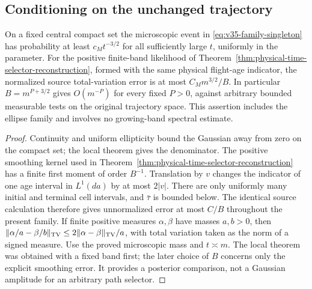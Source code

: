 \subsection{Conditioning on the unchanged trajectory}
\begin{corollary}
\label{cor:v35-family-posterior}
On a fixed central compact set the microscopic event in
\eqref{eq:v35-family-singleton} has probability at least $c_Mt^{-3/2}$
for all sufficiently large $t$, uniformly in the parameter.
For the positive finite-band likelihood of
Theorem~\ref{thm:physical-time-selector-reconstruction}, formed with the same
physical flight-age indicator, the normalized source total-variation
error is at most $C_M m^{3/2}/B$. In particular $B=m^{P+3/2}$ gives
$O(m^{-P})$ for every fixed $P>0$, against arbitrary bounded measurable
tests on the original trajectory space. This assertion includes the
ellipse family and involves no growing-band spectral estimate.
\end{corollary}
\begin{proof}
Continuity and uniform ellipticity bound the Gaussian away from zero
on the compact set; the local theorem gives the denominator. The
positive smoothing kernel used in
Theorem~\ref{thm:physical-time-selector-reconstruction} has a finite first
moment of order $B^{-1}$. Translation by $v$ changes the indicator of
one age interval in $L^1(da)$ by at most $2|v|$. There are only uniformly
many initial and terminal cell intervals, and $\bar\tau$ is bounded
below. The identical source calculation therefore gives unnormalized
error at most $C/B$ throughout the present family. If finite positive
measures $\alpha,\beta$ have masses $a,b>0$, then
$\|\alpha/a-\beta/b\|_{\rm TV}\le2\|\alpha-\beta\|_{\rm TV}/a$,
with total variation taken as the norm of a signed measure.
Use the proved microscopic mass and $t\asymp m$. The local theorem
was obtained with a fixed band first; the later choice of $B$ concerns
only the explicit smoothing error. It provides a posterior comparison,
not a Gaussian amplitude for an arbitrary path selector.
\end{proof}
